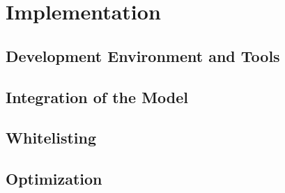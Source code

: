 \section{Implementation}

\subsection{Development Environment and Tools}

\subsection{Integration of the Model}

\subsection{Whitelisting}\label{implementation:whitelisting}

\subsection{Optimization}

\newpage

